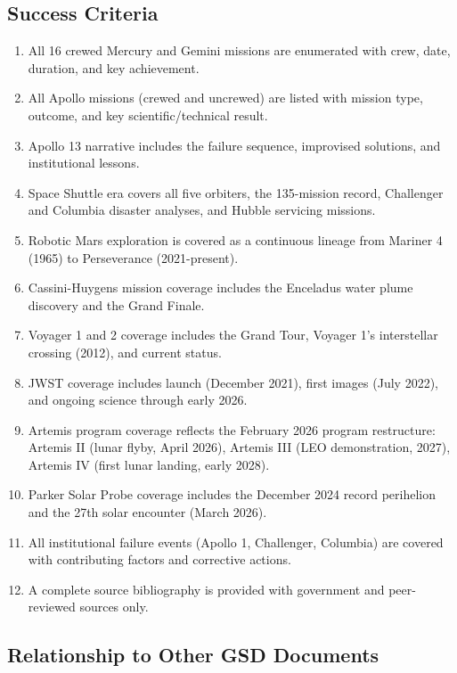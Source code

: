 \documentclass[11pt,letterpaper]{article}
\begin{document}
\subsection{Success Criteria}

\begin{enumerate}[leftmargin=*, label=\textbf{SC\arabic*.}]
  \item All 16 crewed Mercury and Gemini missions are enumerated with crew, date, duration, and key achievement.
  \item All Apollo missions (crewed and uncrewed) are listed with mission type, outcome, and key scientific/technical result.
  \item Apollo 13 narrative includes the failure sequence, improvised solutions, and institutional lessons.
  \item Space Shuttle era covers all five orbiters, the 135-mission record, Challenger and Columbia disaster analyses, and Hubble servicing missions.
  \item Robotic Mars exploration is covered as a continuous lineage from Mariner 4 (1965) to Perseverance (2021-present).
  \item Cassini-Huygens mission coverage includes the Enceladus water plume discovery and the Grand Finale.
  \item Voyager 1 and 2 coverage includes the Grand Tour, Voyager 1's interstellar crossing (2012), and current status.
  \item JWST coverage includes launch (December 2021), first images (July 2022), and ongoing science through early 2026.
  \item Artemis program coverage reflects the February 2026 program restructure: Artemis II (lunar flyby, April 2026), Artemis III (LEO demonstration, 2027), Artemis IV (first lunar landing, early 2028).
  \item Parker Solar Probe coverage includes the December 2024 record perihelion and the 27th solar encounter (March 2026).
  \item All institutional failure events (Apollo 1, Challenger, Columbia) are covered with contributing factors and corrective actions.
  \item A complete source bibliography is provided with government and peer-reviewed sources only.
\end{enumerate}

\subsection{Relationship to Other GSD Documents}
\end{document}
